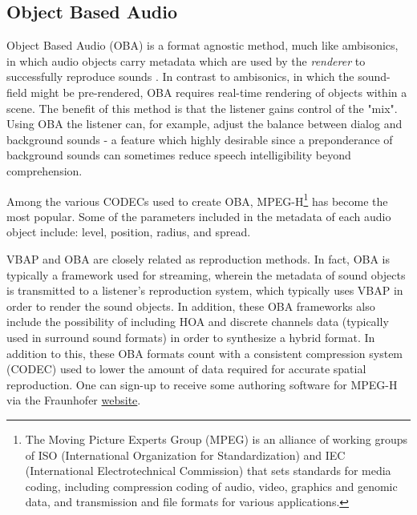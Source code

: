 \subsection{Object Based Audio}
\label{subsec:oba}


Object Based Audio (OBA) is a format agnostic method, much like ambisonics, in which audio objects carry metadata which are used by the \textit{renderer} to successfully reproduce sounds \cite{coleman2018audio}. In contrast to ambisonics, in which the sound-field might be pre-rendered, OBA requires real-time rendering of objects within a scene. The benefit of this method is that the listener gains control of the "mix". Using OBA the listener can, for example, adjust the balance between dialog and background sounds - a feature which highly desirable since a preponderance of background sounds can sometimes reduce speech intelligibility beyond comprehension.

Among the various CODECs used to create OBA, MPEG-H\footnote{The Moving Picture Experts Group (MPEG) is an alliance of working groups of ISO (International Organization for Standardization) and IEC (International Electrotechnical Commission) that sets standards for media coding, including compression coding of audio, video, graphics and genomic data, and transmission and file formats for various applications.} has become the most popular. Some of the parameters included in the metadata of each audio object include: level, position, radius, and spread\cite{fug2014design}. 

VBAP and OBA are closely related as reproduction methods. In fact, OBA is typically a framework used for streaming, wherein the metadata of sound objects is transmitted to a listener's reproduction system, which typically uses VBAP in order to render the sound objects. In addition, these OBA frameworks also include the possibility of including HOA and discrete channels data (typically used in surround sound formats) in order to synthesize a hybrid format. In addition to this, these OBA formats count with a consistent compression system (CODEC) used to lower the amount of data required for accurate spatial reproduction. One can sign-up to receive some authoring software for MPEG-H via the Fraunhofer \href{https://www.iis.fraunhofer.de/en/ff/amm/dl/software/mas.html}{website}.

